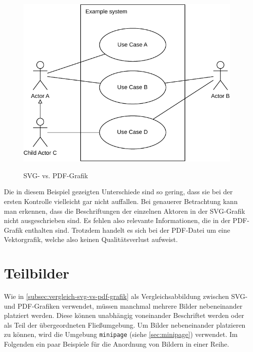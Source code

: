 \begin{figure}[H]
    \begin{minipage}[c]{0.48\columnwidth}
        \includegraphics[width=\linewidth]{assets/images/bilder/UML-exmaple.pdf}
        \label{subfig:pdf-grafik}
    \end{minipage}
    \hfill
    \begin{minipage}[c]{0.48\columnwidth}
        
        \label{subfig:svg-grafik}
    \end{minipage}       
    \caption{SVG- vs. PDF-Grafik} 
\end{figure}

Die in diesem Beispiel gezeigten Unterschiede sind so gering, dass sie bei der ersten Kontrolle vielleicht gar nicht auffallen. Bei genauerer Betrachtung kann man erkennen, dass die Beschriftungen der einzelnen Aktoren in der SVG-Grafik nicht ausgeschrieben sind. Es fehlen also relevante Informationen, die in der PDF-Grafik enthalten sind. Trotzdem handelt es sich bei der PDF-Datei um eine Vektorgrafik, welche also keinen Qualitätsverlust aufweist.

\section{Teilbilder}
Wie in \autoref{subsec:vergleich-svg-vs-pdf-grafik} als Vergleichsabbildung zwischen SVG- und PDF-Grafiken verwendet, müssen manchmal mehrere Bilder nebeneinander platziert werden. Diese können unabhängig voneinander Beschriftet werden oder als Teil der übergeordneten Fließumgebung. Um Bilder nebeneinander platzieren zu können, wird die Umgebung \texttt{minipage} (siehe \autoref{sec:minipage}) verwendet. Im Folgenden ein paar Beispiele für die Anordnung von Bildern in einer Reihe.

